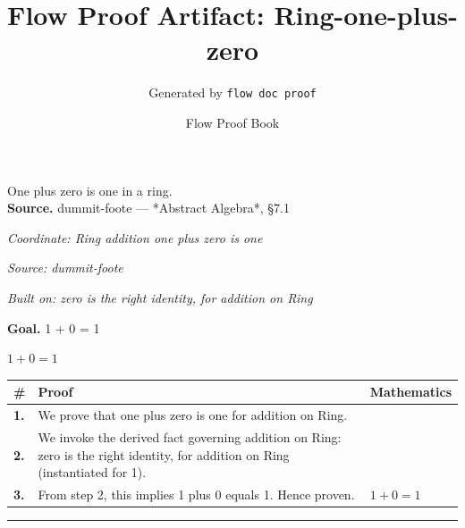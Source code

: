 \documentclass[11pt]{article}
\title{Flow Proof Artifact: Ring-one-plus-zero}
\author{Generated by \texttt{flow doc proof}}
\date{Flow Proof Book}
\theoremstyle{definition}
\begin{document}
\maketitle
One plus zero is one in a ring.\\[0.5em]
\textbf{Source.} dummit-foote — *Abstract Algebra*, §7.1\\[0.5em]
\bigskip
{}\par
\smallskip\noindent\textit{Coordinate: Ring \cdot addition \cdot one plus zero is one}\par
\smallskip\noindent\textit{Source: dummit-foote}\par
\smallskip\noindent\textit{Built on: zero is the right identity, for addition on Ring}\par
\medskip
\noindent\textbf{Goal.} 1 + 0 = 1\par
\noindent$\displaystyle 1 + 0 = 1$\par
\medskip
\noindent
\begin{tabular}{@{} >{\raggedright\arraybackslash}p{} >{\raggedright\arraybackslash}p{} >{\raggedleft\arraybackslash}p{} @{}}
\textbf{\#} & \textbf{Proof} & \textbf{Mathematics} \\
\midrule
\textbf{1.} & We prove that one plus zero is one for addition on Ring. & \\[0.45em]
\textbf{2.} & We invoke the derived fact governing addition on Ring: zero is the right identity, for addition on Ring (instantiated for 1). & \\[0.45em]
\textbf{3.} & From step 2, this implies 1 plus 0 equals 1. Hence proven. & $\displaystyle 1 + 0 = 1$ \\[0.45em]
\bottomrule
\end{tabular}
\label{thm:Ring-addition-one_plus_zero_is_one}
\par\medskip\hrule
\end{document}
